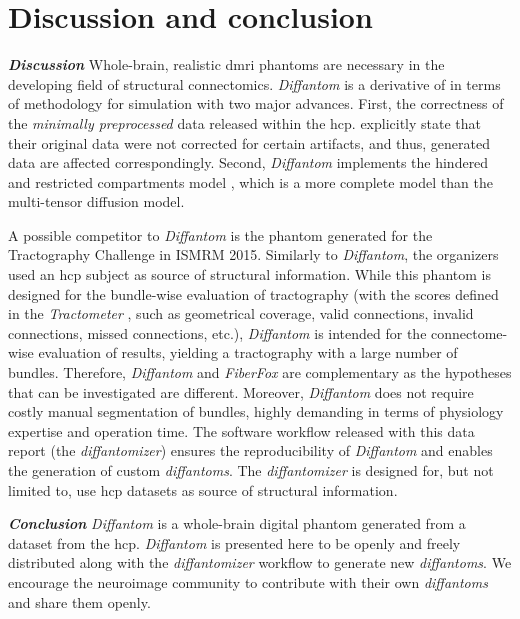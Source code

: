 \documentclass[english]{frontiers/frontiersSCNS} %
\providecommand{\diffantom}{\emph{Diffantom}}
\providecommand{\Diffantom}{\emph{Diffantom}}
\begin{document}
\section*{Discussion and conclusion}
\noindent\textbf{\textit{Discussion\textcolon}}\label{sec:discussion} %
Whole-brain, realistic \gls*{dmri} phantoms are necessary in the developing field of structural
  connectomics.
\Diffantom{} is a derivative of \citep{wilkins_fiber_2015} in terms of methodology for
  simulation with two major advances.
First, the correctness of the \emph{minimally preprocessed} data \citep{glasser_minimal_2013}
  released within the \gls*{hcp}.
\cite{wilkins_fiber_2015} explicitly state that their original data were not corrected for certain artifacts,
  and thus, generated data are affected correspondingly.
Second, \diffantom{} implements the hindered and restricted compartments model \citep{assaf_composite_2005},
  which is a more complete model than the multi-tensor diffusion model.

A possible competitor to \diffantom{} is the phantom generated for the Tractography Challenge in
  ISMRM 2015.
Similarly to \diffantom{}, the organizers used an \gls*{hcp} subject as source of structural information.
While this phantom is designed for the bundle-wise evaluation of tractography (with the scores defined in the
  \emph{Tractometer} \citep{cote_tractometer_2013}, such as geometrical coverage, valid connections, invalid connections,
  missed connections, etc.), \diffantom{} is intended for the connectome-wise evaluation of results,
  yielding a tractography with a large number of bundles.
Therefore, \diffantom{} and \emph{FiberFox} are complementary as the hypotheses that can be investigated are different.
Moreover, \diffantom{} does not require costly manual segmentation of bundles, highly demanding in terms of physiology
  expertise and operation time.
The software workflow released with this data report (the \emph{diffantomizer}) ensures the reproducibility of
  \diffantom{} and enables the generation of custom \emph{diffantoms}.
The \emph{diffantomizer} is designed for, but not limited to, use \gls*{hcp} datasets as source of structural information.

\noindent\textbf{\textit{Conclusion\textcolon}}\label{sec:conclusion} %
\Diffantom{} is a whole-brain digital phantom generated from a dataset from the \acrlong*{hcp}.
\Diffantom{} is presented here to be openly and freely distributed along with the \emph{diffantomizer} workflow
  to generate new \emph{diffantoms}.
We encourage the neuroimage community to contribute with their own \emph{diffantoms} and share them openly.
\end{document}
